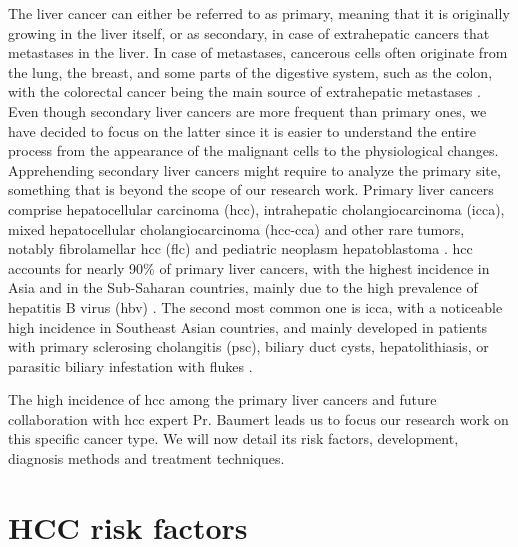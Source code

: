 The liver cancer can either be referred to as primary, meaning that it
is originally growing in the liver itself, or as secondary, in case of
extrahepatic cancers that metastases in the liver.
In case of metastases, cancerous cells often originate from the lung,
the breast, and some parts of the digestive system, such as the colon,
with the colorectal cancer being the main source of extrahepatic
metastases \cite{Hoyer2012a, Sahani2014}.
Even though secondary liver cancers are more frequent than primary ones,
we have decided to focus on the latter since it is easier to understand the entire process
from the appearance of the malignant cells to the physiological changes. Apprehending secondary liver cancers might require to analyze the primary site, something that is beyond the scope of our research work.
Primary liver cancers comprise hepatocellular carcinoma (\ac{hcc}),
intrahepatic cholangiocarcinoma (\ac{icca}), mixed hepatocellular
cholangiocarcinoma (\ac{hcc-cca}) and other rare tumors, notably
fibrolamellar \ac{hcc} (\ac{flc}) and pediatric neoplasm hepatoblastoma
\cite{Sia2017, Lozano2012,20113051318}.
\ac{hcc} accounts for nearly 90\% of primary liver cancers, with the highest
incidence in Asia and in the Sub-Saharan countries, mainly due to the
high prevalence of hepatitis B virus (\ac{hbv}) \cite{Sia2017, Torre2015}. The second most common one is \ac{icca}, with a
noticeable high incidence in Southeast Asian countries, and mainly
developed in patients with primary sclerosing cholangitis (\ac{psc}),
biliary duct cysts, hepatolithiasis, or parasitic biliary infestation
with flukes \cite{Sia2017, Bridgewater2014}.

The high incidence of \ac{hcc} among the primary liver cancers and future collaboration with \ac{hcc} expert Pr. Baumert leads us to focus our research work on
this specific cancer type. We will now detail its risk factors,
development, diagnosis methods and treatment techniques.


\section{HCC risk factors}\label{risk-factors}

